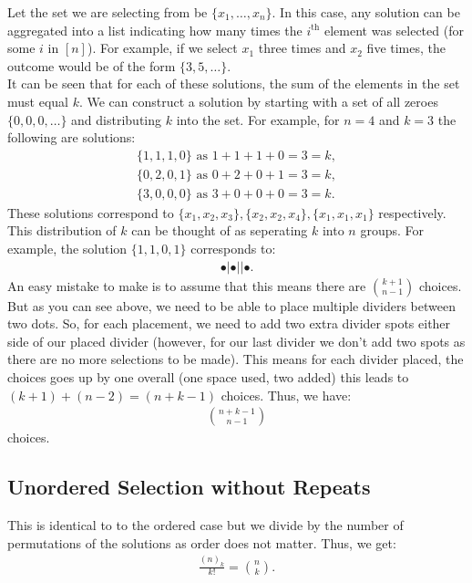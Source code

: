 \documentclass[a4paper, 12pt, twoside]{article}
\begin{document}
Let the set we are selecting from be $\{x_1, \ldots, x_n\}$. In this case, 
any solution can be aggregated into a list indicating how
many times the $i^{\text{th}}$ element was selected (for some $i$ in $[n]$).
For example, if we select $x_1$ three times and $x_2$ five times, 
the outcome would be of the form $\{3, 5, \ldots\}$.
\\[\baselineskip]
It can be seen that for each of these solutions, the sum of the elements in
the set must equal $k$. We can construct a solution by starting with a set
of all zeroes $\{0, 0, 0, \ldots\}$ and distributing $k$ into the set. For
example, for $n = 4$ and $k = 3$ the following are solutions: \begin{gather*}
  \{1, 1, 1, 0\} \text{ as } 1 + 1 + 1 + 0 = 3 = k, \\
  \{0, 2, 0, 1\} \text{ as } 0 + 2 + 0 + 1 = 3 = k, \\
  \{3, 0, 0, 0\} \text{ as } 3 + 0 + 0 + 0 = 3 = k.
\end{gather*} These solutions correspond to $\{x_1, x_2, x_3\}, 
\{x_2, x_2, x_4\}, \{x_1, x_1, x_1\}$ respectively.
\\[\baselineskip]
This distribution of $k$ can be thought of as seperating $k$ into $n$
groups. For example, the solution $\{1, 1, 0, 1\}$ corresponds to: \begin{gather*}
  \bullet | \bullet | | \bullet.
\end{gather*} An easy mistake to make is to assume that this means there are 
${k + 1 \choose n - 1}$ choices. But as you can see above, we need to be able to place
multiple dividers between two dots. So, for each placement, we need to add
two extra divider spots either side of our placed divider (however, for our
last divider we don't add two spots as there are no more selections to be made).
This means for each divider placed, the choices goes up by one overall (one
space used, two added) this leads to $(k + 1) + (n - 2) = (n + k - 1)$ choices.
Thus, we have: \begin{gather*}
  {n + k - 1 \choose n - 1}
\end{gather*} choices.

\subsection{Unordered Selection without Repeats}

This is identical to to the ordered case but we divide by the number
of permutations of the solutions as order does not matter. Thus, we get:
\begin{gather*}
  \frac{(n)_k}{k!} = {n \choose k}.
\end{gather*}
\end{document}
